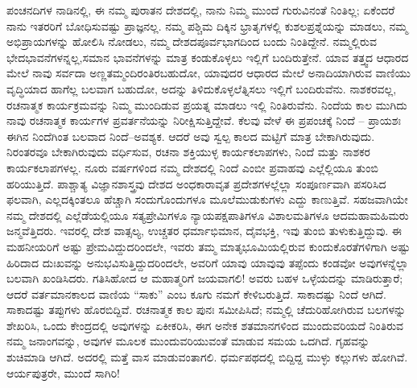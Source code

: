 ಪಂಚನದಿಗಳ ನಾಡಿನಲ್ಲಿ, ಈ ನಮ್ಮ ಪುರಾತನ ದೇಶದಲ್ಲಿ, ನಾನು ನಿಮ್ಮ ಮುಂದೆ ಗುರುವಿನಂತೆ ನಿಂತಿಲ್ಲ; ಏಕೆಂದರೆ ನಾನು ಇತರರಿಗೆ ಬೋಧಿಸುವಷ್ಟು ಪ್ರಾಜ್ಞನಲ್ಲ. ನಮ್ಮ ಪಶ್ಚಿಮ ದಿಕ್ಕಿನ ಭ್ರಾತೃಗಳಲ್ಲಿ ಕುಶಲಪ್ರಶ್ನೆಯನ್ನು ಮಾಡಲು, ನಮ್ಮ ಅಭಿಪ್ರಾಯಗಳನ್ನು ಹೋಲಿಸಿ ನೋಡಲು, ನಮ್ಮ ದೇಶದ\break ಪೂರ್ವಭಾಗದಿಂದ ಬಂದು ನಿಂತಿದ್ದೇನೆ. ನಮ್ಮಲ್ಲಿರುವ ಭೇದಭಾವನೆಗಳನ್ನಲ್ಲ,\break ಸಮಾನ ಭಾವನೆಗಳನ್ನು ಮಾತ್ರ ಕಂಡುಕೊಳ್ಳಲು ಇಲ್ಲಿಗೆ ಬಂದಿರುತ್ತೇನೆ. ಯಾವ ತತ್ತ್ವದ ಆಧಾರದ ಮೇಲೆ ನಾವು ಸರ್ವದಾ ಅಣ್ಣತಮ್ಮಂದಿರಂತಿರಬಹುದೋ, ಯಾವುದರ ಆಧಾರದ ಮೇಲೆ ಅನಾದಿಯಾಗಿರುವ ವಾಣಿಯು ವೃದ್ಧಿಯಾದ ಹಾಗೆಲ್ಲ ಬಲವಾಗ ಬಹುದೋ, ಅದನ್ನು ತಿಳಿದುಕೊಳ್ಳಲೆತ್ನಿಸಲು ಇಲ್ಲಿಗೆ ಬಂದಿರುವೆನು. ನಾಶಕರವಲ್ಲ, ರಚನಾತ್ಮಕ ಕಾರ್ಯಕ್ರಮವನ್ನು ನಿಮ್ಮ ಮುಂದಿಡುವ ಪ್ರಯತ್ನ ಮಾಡಲು ಇಲ್ಲಿ ನಿಂತಿರುವೆನು. ನಿಂದೆಯ ಕಾಲ ಮುಗಿದು ನಾವು ರಚನಾತ್ಮಕ ಕಾರ್ಯಗಳ ಪ್ರವರ್ತನೆಯನ್ನು ನಿರೀಕ್ಷಿಸುತ್ತಿದ್ದೇವೆ. ಕೆಲವು ವೇಳೆ ಈ ಪ್ರಪಂಚಕ್ಕೆ ನಿಂದೆ – ಪ್ರಾಯಶಃ ಈಗಿನ ನಿಂದೆಗಿಂತ ಬಲವಾದ ನಿಂದೆ–ಅವಶ್ಯಕ. ಆದರೆ ಅವು ಸ್ವಲ್ಪ ಕಾಲದ ಮಟ್ಟಿಗೆ ಮಾತ್ರ ಬೇಕಾಗಿರುವುದು. ನಿರಂತರವೂ ಬೇಕಾಗಿರುವುದು ವರ್ಧಿಸುವ, ರಚನಾ ಶಕ್ತಿಯುಳ್ಳ ಕಾರ್ಯಕಲಾಪಗಳು, ನಿಂದೆ ಮತ್ತು ನಾಶಕರ ಕಾರ್ಯಕಲಾಪಗಳಲ್ಲ. ನೂರು ವರ್ಷಗಳಿಂದ ನಮ್ಮ ದೇಶದಲ್ಲಿ ನಿಂದೆ ಎಂಬೀ ಪ್ರವಾಹವು ಎಲ್ಲೆಲ್ಲಿಯೂ ತುಂಬಿ ಹರಿಯುತ್ತಿದೆ. ಪಾಶ್ಚಾತ್ಯ ವಿಜ್ಞಾನಶಾಸ್ತ್ರವು ದೇಶದ ಅಂಧಕಾರಾವೃತ ಪ್ರದೇಶಗಳಲ್ಲೆಲ್ಲಾ ಸಂಪೂರ್ಣವಾಗಿ ಪಸರಿಸಿದ ಫಲವಾಗಿ, ಎಲ್ಲದಕ್ಕಿಂತಲೂ ಹೆಚ್ಚಾಗಿ ಸಂದುಗೊಂದುಗಳೂ ಮೂಲೆಮುಡುಕುಗಳು ಎದ್ದು ಕಾಣುತ್ತಿವೆ. ಸಹಜವಾಗಿಯೇ ನಮ್ಮ ದೇಶದಲ್ಲಿ ಎಲ್ಲೆಡೆಯಲ್ಲಿಯೂ ಸತ್ಯಪ್ರೇಮಿಗಳೂ ನ್ಯಾಯಪಕ್ಷಪಾತಿಗಳೂ ವಿಶಾಲಮತಿಗಳೂ ಆದ\break ಮಹಾಮಹಿಮರು ಜನ್ಮವೆತ್ತಿದರು. ಇವರಲ್ಲಿ ದೇಶ ವಾತ್ಸಲ್ಯ, ಉಚ್ಚತರ ಧರ್ಮಾಭಿ\-ಮಾನ, ದೈವಭಕ್ತಿ, ಇವು ತುಂಬಿ ತುಳುಕುತ್ತಿದ್ದುವು. ಈ ಮಹನೀಯರಿಗೆ ಅಷ್ಟು ಪ್ರೇಮವಿದ್ದುದರಿಂದಲೇ, ಇವರು ತಮ್ಮ ಮಾತೃಭೂಮಿಯಲ್ಲಿರುವ ಕುಂದುಕೊರತೆಗಳಿಗಾಗಿ ಅಷ್ಟು ಹಿರಿದಾದ ದುಃಖವನ್ನು ಅನುಭವಿಸುತ್ತಿದ್ದುದರಿಂದಲೇ, ಅವರಿಗೆ ಯಾವು ಯಾವುವು ತಪ್ಪೆಂದು ಕಂಡವೋ ಅವುಗಳನ್ನೆಲ್ಲಾ ಬಲವಾಗಿ ಖಂಡಿಸಿದರು. ಗತಿಸಿಹೋದ ಆ ಮಹಾತ್ಮರಿಗೆ ಜಯವಾಗಲಿ! ಅವರು ಬಹಳ ಒಳ್ಳೆಯದನ್ನು ಮಾಡಿರುತ್ತಾರೆ; ಆದರೆ ವರ್ತಮಾನಕಾಲದ ವಾಣಿಯ “ಸಾಕು” ಎಂಬ ಕೂಗು ನಮಗೆ ಕೇಳಿಬರುತ್ತಿದೆ. ಸಾಕಾದಷ್ಟು ನಿಂದೆ ಆಗಿದೆ. ಸಾಕಾದಷ್ಟು ತಪ್ಪುಗಳು ಹೊರಬಿದ್ದಿವೆ. ರಚನಾತ್ಮಕ ಕಾಲ ಪುನಃ ಸಮೀಪಿಸಿದೆ; ನಮ್ಮಲ್ಲಿ ಚೆದುರಿಹೋಗಿರುವ ಬಲಗಳನ್ನು ಶೇಖರಿಸಿ, ಒಂದು ಕೇಂದ್ರದಲ್ಲಿ ಅವುಗಳನ್ನು ಏಕೀಕರಿಸಿ, ಈಗ ಅನೇಕ ಶತಮಾನಗಳಿಂದ ಮುಂದುವರಿಯದೆ ನಿಂತಿರುವ ನಮ್ಮ ಜನಾಂಗವನ್ನು, ಅವುಗಳ ಮೂಲಕ ಮುಂದುವರಿಯುವಂತೆ ಮಾಡುವ ಸಮಯ ಒದಗಿದೆ. ಗೃಹವನ್ನು ಶುಚಿಮಾಡಿ ಆಗಿದೆ. ಅದರಲ್ಲಿ ಮತ್ತೆ ವಾಸ ಮಾಡುವಂತಾಗಲಿ. ಧರ್ಮಪಥದಲ್ಲಿ ಬಿದ್ದಿದ್ದ ಮುಳ್ಳು ಕಲ್ಲುಗಳು ಹೋಗಿವೆ. ಆರ್ಯಪುತ್ರರೇ, ಮುಂದೆ ಸಾಗಿರಿ!


